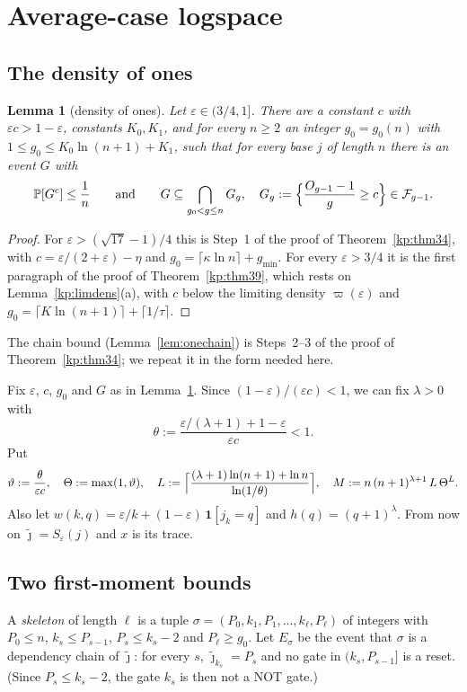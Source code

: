 \documentclass[11pt]{amsart}
\newtheorem{lemma}[theorem]{Lemma}
\theoremstyle{definition}
\theoremstyle{remark}
\newcommand{\eps}{\varepsilon}
\newcommand{\jt}{\tilde{\jmath}}
\newcommand{\PP}{\mathbb{P}}
\newcommand{\cF}{\mathcal{F}}
\begin{document}
\section{Average-case logspace}\label{sec:logspace}

\subsection{The density of ones}

\begin{lemma}[density of ones]\label{fact:density}
Let $\eps\in(3/4,1]$. There are a constant $c$ with $\eps c>1-\eps$, constants $K_0,K_1$, and for
every $n\ge 2$ an integer $g_0=g_0(n)$ with $1\le g_0\le K_0\ln(n+1)+K_1$, such that for every base $j$
of length $n$ there is an event $G$ with
\[
\PP[G^c]\le \frac1n\qquad\text{and}\qquad G\subseteq\bigcap_{g_0<g\le n}G_g,\quad G_g:=\Bigl\{\frac{O_{g-1}-1}{g}\ge c\Bigr\}\in\cF_{g-1}.
\]
\end{lemma}

\begin{proof}
For $\eps>(\sqrt{17}-1)/4$ this is Step~1 of the proof of Theorem~\ref{kp:thm34}, with
$c=\eps/(2+\eps)-\eta$ and $g_0=\lceil\kappa\ln n\rceil+g_{\min}$. For every $\eps>3/4$ it is the
first paragraph of the proof of Theorem~\ref{kp:thm39}, which rests on
Lemma~\ref{kp:limdens}(a), with $c$ below the limiting density $\varpi(\eps)$ and
$g_0=\lceil K\ln(n+1)\rceil+\lceil1/\tau\rceil$.
\end{proof}

\noindent The chain bound (Lemma~\ref{lem:onechain}) is Steps~2--3 of the proof of
Theorem~\ref{kp:thm34}; we repeat it in the form needed here.

\smallskip
Fix $\eps$, $c$, $g_0$ and $G$ as in Lemma~\ref{fact:density}. Since $(1-\eps)/(\eps c)<1$, we can
fix $\lambda>0$ with
\[
\theta:=\frac{\eps/(\lambda+1)+1-\eps}{\eps c}<1 .
\]
Put
\[
\vartheta:=\frac{\theta}{\eps c},\quad \Theta:=\max(1,\vartheta),\quad
L:=\Bigl\lceil\frac{(\lambda+1)\ln(n+1)+\ln n}{\ln(1/\theta)}\Bigr\rceil,\quad
M:=n\,(n+1)^{\lambda+1}\,L\,\Theta^{L}.
\]
Also let $w(k,q)=\eps/k+(1-\eps)\,\mathbf 1[j_k=q]$ and $h(q)=(q+1)^\lambda$. From now on
$\jt=S_\eps(j)$ and $x$ is its trace.

\subsection{Two first-moment bounds}

A \emph{skeleton} of length $\ell$ is a tuple $\sigma=(P_0,k_1,P_1,\dots,k_\ell,P_\ell)$ of integers
with $P_0\le n$, $k_s\le P_{s-1}$, $P_s\le k_s-2$ and $P_\ell\ge g_0$. Let $E_\sigma$ be the event
that $\sigma$ is a dependency chain of $\jt$: for every $s$, $\jt_{k_s}=P_s$ and no gate in
$(k_s,P_{s-1}]$ is a reset. (Since $P_s\le k_s-2$, the gate $k_s$ is then not a NOT gate.)
\end{document}
